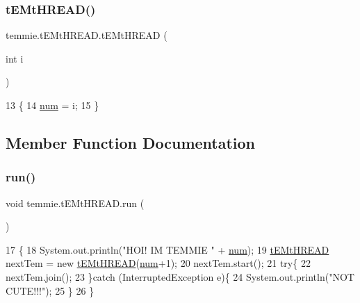 \subsubsection{\texorpdfstring{t\+E\+Mt\+H\+R\+E\+A\+D()}{tEMtHREAD()}}
{\footnotesize\ttfamily temmie.\+t\+E\+Mt\+H\+R\+E\+A\+D.\+t\+E\+Mt\+H\+R\+E\+AD (\begin{DoxyParamCaption}\item[{int}]{i }\end{DoxyParamCaption})\hspace{0.3cm}{\ttfamily [inline]}}


\begin{DoxyCode}
13                            \{
14         \mbox{\hyperlink{classtemmie_1_1t_e_mt_h_r_e_a_d_aafd575451a2e64d7376e0e715b301624}{num}} = i;
15     \}
\end{DoxyCode}


\subsection{Member Function Documentation}
\mbox{\label{classtemmie_1_1t_e_mt_h_r_e_a_d_a370afd7a88b491ab0cf01c5b4c571100}} 
\subsubsection{\texorpdfstring{run()}{run()}}
{\footnotesize\ttfamily void temmie.\+t\+E\+Mt\+H\+R\+E\+A\+D.\+run (\begin{DoxyParamCaption}{ }\end{DoxyParamCaption})\hspace{0.3cm}{\ttfamily [inline]}}


\begin{DoxyCode}
17                       \{
18         System.out.println(\textcolor{stringliteral}{"HOI! IM TEMMIE "} + \mbox{\hyperlink{classtemmie_1_1t_e_mt_h_r_e_a_d_aafd575451a2e64d7376e0e715b301624}{num}});
19         \mbox{\hyperlink{classtemmie_1_1t_e_mt_h_r_e_a_d_a1c67150dddfd2cb4259c847fb97ccefe}{tEMtHREAD}} nextTem = \textcolor{keyword}{new} \mbox{\hyperlink{classtemmie_1_1t_e_mt_h_r_e_a_d_a1c67150dddfd2cb4259c847fb97ccefe}{tEMtHREAD}}(\mbox{\hyperlink{classtemmie_1_1t_e_mt_h_r_e_a_d_aafd575451a2e64d7376e0e715b301624}{num}}+1);  
20         nextTem.start();
21         \textcolor{keywordflow}{try}\{
22             nextTem.join();
23         \}\textcolor{keywordflow}{catch} (InterruptedException e)\{
24             System.out.println(\textcolor{stringliteral}{"NOT CUTE!!!"});
25         \}
26     \}
\end{DoxyCode}


